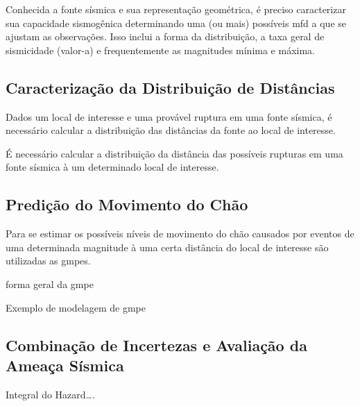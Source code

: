 Conhecida a fonte sísmica e sua representação geométrica, é preciso caracterizar sua capacidade sismogênica determinando
uma (ou mais) possíveis \gls{mfd} a que se ajustam as observações. Isso inclui a forma da distribuição, a taxa geral de
sismicidade (valor-a) e frequentemente as magnitudes mínima e máxima. 

\subsection{Caracterização da Distribuição de Distâncias}
\label{sec:psha_distances}

Dados um local de interesse e uma provável ruptura em uma fonte sísmica, é necessário calcular a distribuição das
distâncias da fonte ao local de interesse.

É necessário calcular a distribuição da distância das possíveis rupturas em uma fonte sísmica à um determinado local de
interesse.


\subsection{Predição do Movimento do Chão}
\label{sec:gmpe}

Para se estimar os possíveis níveis de movimento do chão causados por eventos de uma determinada magnitude à uma certa
distância do local de interesse são utilizadas as \glspl{gmpe}.

forma geral da gmpe

Exemplo de modelagem de gmpe


\subsection{Combinação de Incertezas e Avaliação da Ameaça Sísmica}
\label{sec:hazard}


Integral do Hazard\ldots.


